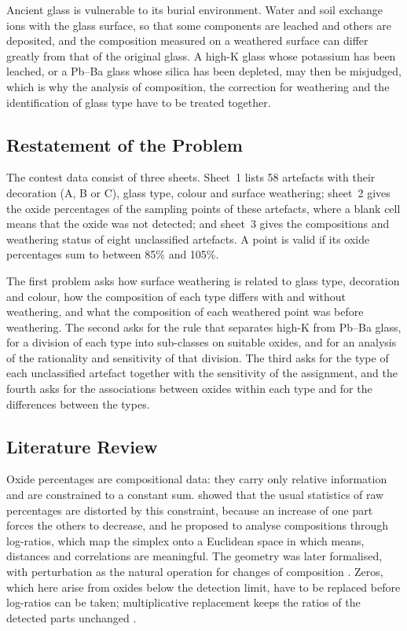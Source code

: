 \documentclass[11pt,a4paper]{article}
\begin{document}
Ancient glass is vulnerable to its burial environment.
Water and soil exchange ions with the glass surface, so that some components are leached and others are deposited, and the composition measured on a weathered surface can differ greatly from that of the original glass.
A high-K glass whose potassium has been leached, or a Pb--Ba glass whose silica has been depleted, may then be misjudged, which is why the analysis of composition, the correction for weathering and the identification of glass type have to be treated together.

\subsection{Restatement of the Problem}
The contest data consist of three sheets.
Sheet~1 lists 58 artefacts with their decoration (A, B or C), glass type, colour and surface weathering; sheet~2 gives the oxide percentages of the sampling points of these artefacts, where a blank cell means that the oxide was not detected; and sheet~3 gives the compositions and weathering status of eight unclassified artefacts.
A point is valid if its oxide percentages sum to between 85\% and 105\%.

The first problem asks how surface weathering is related to glass type, decoration and colour, how the composition of each type differs with and without weathering, and what the composition of each weathered point was before weathering.
The second asks for the rule that separates high-K from Pb--Ba glass, for a division of each type into sub-classes on suitable oxides, and for an analysis of the rationality and sensitivity of that division.
The third asks for the type of each unclassified artefact together with the sensitivity of the assignment, and the fourth asks for the associations between oxides within each type and for the differences between the types.

\subsection{Literature Review}
Oxide percentages are compositional data: they carry only relative information and are constrained to a constant sum.
\citet{aitchison1986} showed that the usual statistics of raw percentages are distorted by this constraint, because an increase of one part forces the others to decrease, and he proposed to analyse compositions through log-ratios, which map the simplex onto a Euclidean space in which means, distances and correlations are meaningful.
The geometry was later formalised, with perturbation as the natural operation for changes of composition \citep{pawlowsky2015}.
Zeros, which here arise from oxides below the detection limit, have to be replaced before log-ratios can be taken; multiplicative replacement keeps the ratios of the detected parts unchanged \citep{martin2003}.
\end{document}
